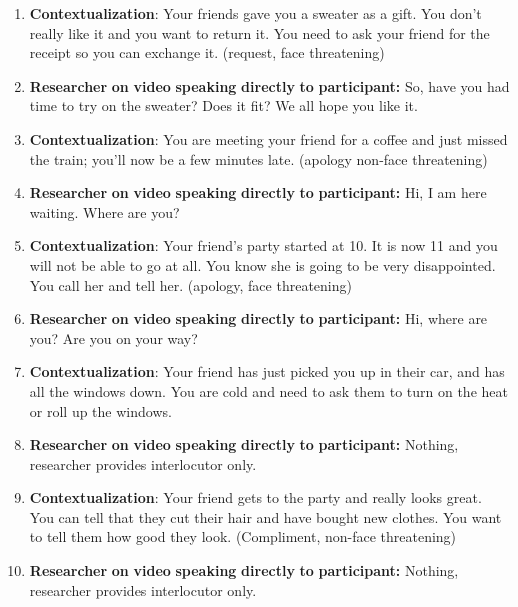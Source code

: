 \documentclass[output=paper]{langsci/langscibook}
\begin{document}
\begin{enumerate}
\item \textbf{Contextualization}: Your friends gave you a sweater as a gift. You don’t really like it and you want to return it. You need to ask your friend for the receipt so you can exchange it. (request, face threatening)

\item \textbf{Researcher} \textbf{on} \textbf{video} \textbf{speaking} \textbf{directly} \textbf{to} \textbf{participant:} So, have you had time to try on the sweater? Does it fit? We all hope you like it.

\item \textbf{Contextualization}: You are meeting your friend for a coffee and just missed the train; you’ll now be a few minutes late. (apology non-face threatening) 

\item \textbf{Researcher} \textbf{on} \textbf{video} \textbf{speaking} \textbf{directly} \textbf{to} \textbf{participant:} Hi, I am here waiting. Where are you? 

\item \textbf{Contextualization}:  Your friend’s party started at 10. It is now 11 and you will not be able to go at all. You know she is going to be very disappointed. You call her and tell her. (apology, face threatening) 

\item \textbf{Researcher} \textbf{on} \textbf{video} \textbf{speaking} \textbf{directly} \textbf{to} \textbf{participant:} Hi, where are you? Are you on your way? 

\item \textbf{Contextualization}: Your friend has just picked you up in their car, and has all the windows down. You are cold and need to ask them to turn on the heat or roll up the windows. 

\item \textbf{Researcher} \textbf{on} \textbf{video} \textbf{speaking} \textbf{directly} \textbf{to} \textbf{participant:} Nothing, researcher provides interlocutor only. 

\item \textbf{Contextualization}: Your friend gets to the party and really looks great. You can tell that they cut their hair and have bought new clothes. You want to tell them how good they look. (Compliment, non-face threatening) 

\item \textbf{Researcher} \textbf{on} \textbf{video} \textbf{speaking} \textbf{directly} \textbf{to} \textbf{participant:} Nothing, researcher provides interlocutor only. 


\end{enumerate}
\end{document}
